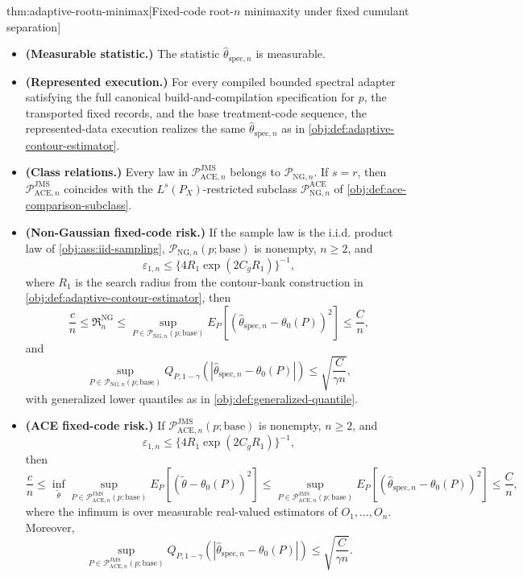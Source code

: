 \documentclass[11pt]{article}
\begin{document}
\begin{theoremv}{thm:adaptive-rootn-minimax}[Fixed-code root-\(n\) minimaxity under fixed cumulant separation]
\begin{itemize}
\item \textbf{(Measurable statistic.)}  The statistic \(\widehat\theta_{\mathrm{spec},n}\) is measurable.
\item \textbf{(Represented execution.)}  For every compiled bounded spectral adapter satisfying the full canonical build-and-compilation specification for \(p\), the transported fixed records, and the base treatment-code sequence, the represented-data execution realizes the same \(\widehat\theta_{\mathrm{spec},n}\) as in \cref{obj:def:adaptive-contour-estimator}.
\item \textbf{(Class relations.)}  Every law in \(\mathcal P_{\mathrm{ACE},n}^{\mathrm{JMS}}\) belongs to \(\mathcal P_{\mathrm{NG},n}\).  If \(s=r\), then \(\mathcal P_{\mathrm{ACE},n}^{\mathrm{JMS}}\) coincides with the \(L^s(P_X)\)-restricted subclass \(\mathcal P_{\mathrm{NG},n}^{\mathrm{ACE}}\) of \cref{obj:def:ace-comparison-subclass}.
\item \textbf{(Non-Gaussian fixed-code risk.)}  If the sample law is the i.i.d. product law of \cref{obj:ass:iid-sampling}, \(\mathcal P_{\mathrm{NG},n}(p;\mathrm{base})\) is nonempty, \(n\ge 2\), and
\[
\varepsilon_{1,n}\le \{4R_1\exp(2C_gR_1)\}^{-1},
\]
where \(R_1\) is the search radius from the contour-bank construction in \cref{obj:def:adaptive-contour-estimator}, then
\[
\frac{c}{n}
\le
\mathfrak R_n^{\mathrm{NG}}
\le
\sup_{P\in\mathcal P_{\mathrm{NG},n}(p;\mathrm{base})}
E_P\!\left[(\widehat\theta_{\mathrm{spec},n}-\theta_0(P))^2\right]
\le
\frac{C}{n},
\]
and
\[
\sup_{P\in\mathcal P_{\mathrm{NG},n}(p;\mathrm{base})}
Q_{P,1-\gamma}\!\left(|\widehat\theta_{\mathrm{spec},n}-\theta_0(P)|\right)
\le
\sqrt{\frac{C}{\gamma n}},
\]
with generalized lower quantiles as in \cref{obj:def:generalized-quantile}.
\item \textbf{(ACE fixed-code risk.)}  If \(\mathcal P_{\mathrm{ACE},n}^{\mathrm{JMS}}(p;\mathrm{base})\) is nonempty, \(n\ge 2\), and
\[
\varepsilon_{1,n}\le \{4R_1\exp(2C_gR_1)\}^{-1},
\]
then
\[
\frac{c}{n}
\le
\inf_{\widetilde\theta}
\sup_{P\in\mathcal P_{\mathrm{ACE},n}^{\mathrm{JMS}}(p;\mathrm{base})}
E_P\!\left[(\widetilde\theta-\theta_0(P))^2\right]
\le
\sup_{P\in\mathcal P_{\mathrm{ACE},n}^{\mathrm{JMS}}(p;\mathrm{base})}
E_P\!\left[(\widehat\theta_{\mathrm{spec},n}-\theta_0(P))^2\right]
\le
\frac{C}{n},
\]
where the infimum is over measurable real-valued estimators of \(O_1,\ldots,O_n\).  Moreover,
\[
\sup_{P\in\mathcal P_{\mathrm{ACE},n}^{\mathrm{JMS}}(p;\mathrm{base})}
Q_{P,1-\gamma}\!\left(|\widehat\theta_{\mathrm{spec},n}-\theta_0(P)|\right)
\le
\sqrt{\frac{C}{\gamma n}}.
\]
\end{itemize}
\end{theoremv}
\end{document}
